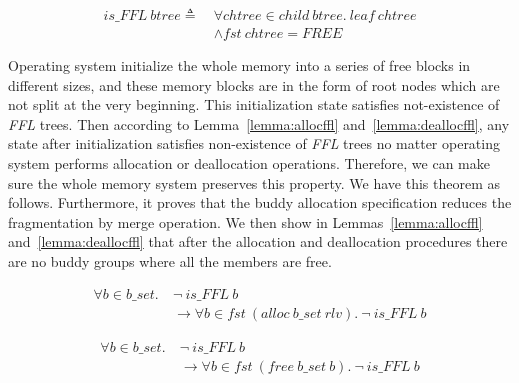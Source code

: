 \begin{definition}  \label{def:FF4}
	\vspace{-7pt}
	{\footnotesize
		\begin{align*}
		is\_FFL\ btree \triangleq\ &\forall chtree \in child\ btree.\ leaf\ chtree \\
		&\wedge fst\ chtree = FREE
		\end{align*}
	}
\end{definition}

Operating system initialize the whole memory into a series of free blocks in different sizes, and these memory blocks are in the form of root nodes which are not split at the very beginning. This initialization state satisfies not-existence of \emph{FFL} trees. Then according to Lemma~\ref{lemma:allocffl} and~\ref{lemma:deallocffl}, any state after initialization satisfies non-existence of \emph{FFL} trees no matter operating system performs allocation or deallocation operations. Therefore, we can make sure the whole memory system preserves this property. We have this theorem as follows. Furthermore, it proves that the buddy allocation specification reduces the fragmentation by merge operation.
We then show in Lemmas~\ref{lemma:allocffl} and~\ref{lemma:deallocffl} that after the allocation and deallocation procedures there are no buddy groups where all the members are free. 

\begin{lemma} 
\label{lemma:allocffl}
\end{lemma}
\vspace{-7pt}
{\footnotesize
\begin{align*}
\forall b \in b\_set.\ &\neg\ is\_FFL\ b \\
&\longrightarrow \forall b \in fst\ (alloc\ b\_set\ rlv).\ \neg\ is\_FFL\ b
\end{align*}
}
\vspace{-12pt}

\begin{lemma} 
\label{lemma:deallocffl}
\end{lemma}
\vspace{-7pt}
{\footnotesize
\begin{align*}
\forall b \in b\_set.\ &\neg\ is\_FFL\ b \\
&\longrightarrow \forall b \in fst\ (free\ b\_set\ b).\ \neg\ is\_FFL\ b
\end{align*}
}
\vspace{-12pt}

